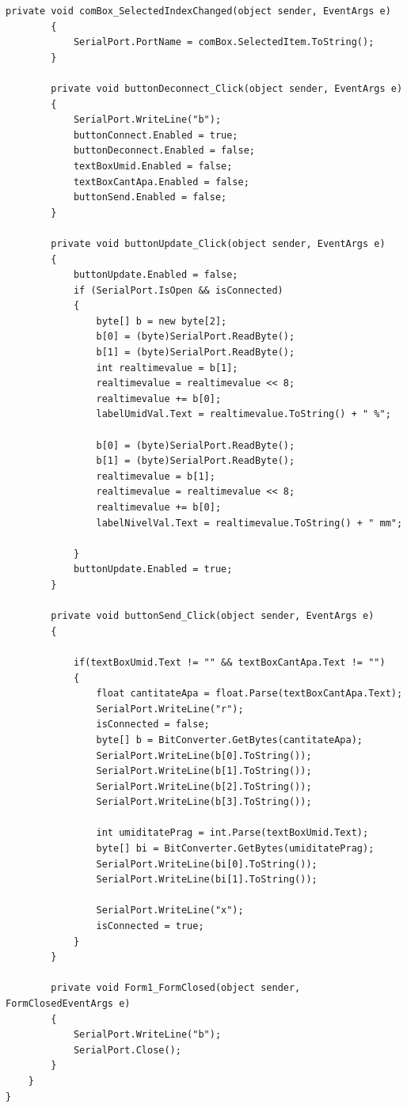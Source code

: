\documentclass[12pt]{article}
\begin{document}
\begin{lstlisting}[style=CStyle]
        private void comBox_SelectedIndexChanged(object sender, EventArgs e)
        {
            SerialPort.PortName = comBox.SelectedItem.ToString();
        }

        private void buttonDeconnect_Click(object sender, EventArgs e)
        {
            SerialPort.WriteLine("b");
            buttonConnect.Enabled = true;
            buttonDeconnect.Enabled = false;
            textBoxUmid.Enabled = false;
            textBoxCantApa.Enabled = false;
            buttonSend.Enabled = false;
        }

        private void buttonUpdate_Click(object sender, EventArgs e)
        {
            buttonUpdate.Enabled = false;
            if (SerialPort.IsOpen && isConnected)
            {
                byte[] b = new byte[2];
                b[0] = (byte)SerialPort.ReadByte();
                b[1] = (byte)SerialPort.ReadByte();
                int realtimevalue = b[1];
                realtimevalue = realtimevalue << 8;
                realtimevalue += b[0];
                labelUmidVal.Text = realtimevalue.ToString() + " %";

                b[0] = (byte)SerialPort.ReadByte();
                b[1] = (byte)SerialPort.ReadByte();
                realtimevalue = b[1];
                realtimevalue = realtimevalue << 8;
                realtimevalue += b[0];
                labelNivelVal.Text = realtimevalue.ToString() + " mm";

            }
            buttonUpdate.Enabled = true;
        }

        private void buttonSend_Click(object sender, EventArgs e)
        {

            if(textBoxUmid.Text != "" && textBoxCantApa.Text != "")
            {
                float cantitateApa = float.Parse(textBoxCantApa.Text);
                SerialPort.WriteLine("r");
                isConnected = false;
                byte[] b = BitConverter.GetBytes(cantitateApa);
                SerialPort.WriteLine(b[0].ToString());
                SerialPort.WriteLine(b[1].ToString());
                SerialPort.WriteLine(b[2].ToString());
                SerialPort.WriteLine(b[3].ToString());

                int umiditatePrag = int.Parse(textBoxUmid.Text);
                byte[] bi = BitConverter.GetBytes(umiditatePrag);
                SerialPort.WriteLine(bi[0].ToString());
                SerialPort.WriteLine(bi[1].ToString());

                SerialPort.WriteLine("x");
                isConnected = true;
            }
        }

        private void Form1_FormClosed(object sender, FormClosedEventArgs e)
        {
            SerialPort.WriteLine("b");
            SerialPort.Close();
        }
    }
}

\end{lstlisting}
\newpage
\end{document}
